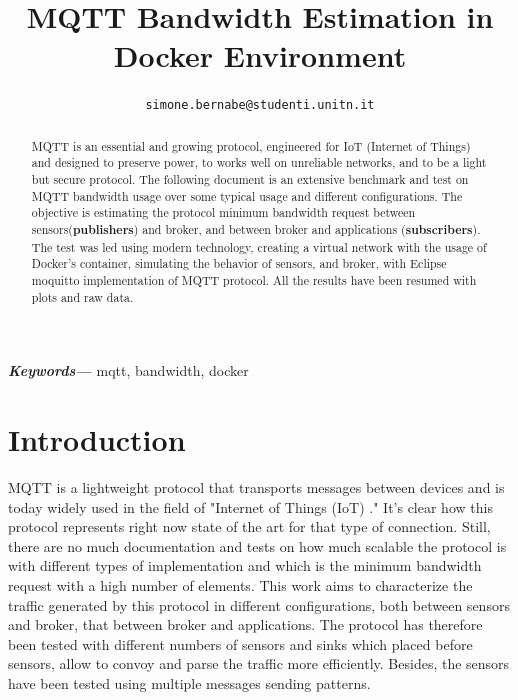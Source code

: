 \documentclass[journal]{IEEEtran}
\providecommand{\keywords}[1]
{
	\small	
	\textbf{\textit{Keywords---}} #1
}
\begin{document}
\title{MQTT Bandwidth Estimation in Docker Environment}

\author{
	\texttt{simone.bernabe@studenti.unitn.it}
}

\makeatletter
\def\endthebibliography{%
	\def\@noitemerr{\@latex@warning{Empty `thebibliography' environment}}%
	\endlist
}
\makeatother


\maketitle

\begin{abstract}
MQTT is an essential and growing protocol, engineered for IoT (Internet of Things) and designed to preserve power, to works well on unreliable networks, and to be a light but secure protocol. The following document is an extensive benchmark and test on MQTT bandwidth usage over some typical usage and different configurations. The objective is estimating the protocol minimum bandwidth request between sensors(\textbf{publishers}) and broker, and between broker and applications (\textbf{subscribers}). The test was led using modern technology, creating a virtual network with the usage of Docker's container, simulating the behavior of sensors, and broker, with Eclipse moquitto implementation of MQTT protocol. All the results have been resumed with plots and raw data.
\end{abstract}
\hspace{10pt}

\keywords{mqtt, bandwidth, docker}

\acresetall

\section{Introduction}
\label{sec:introduction}
MQTT is a lightweight protocol that transports messages between devices and is today widely used in the field of "Internet of Things (IoT) \cite{mqtt}." 
It's clear how this protocol represents right now state of the art for that type of connection. Still, there are no much documentation and tests on how much scalable the protocol is with different types of implementation and which is the minimum bandwidth request with a high number of elements. This work aims to characterize the traffic generated by this protocol in different configurations, both between sensors and broker, that between broker and applications. The protocol has therefore been tested with different numbers of sensors and sinks which placed before sensors, allow to convoy and parse the traffic more efficiently. Besides, the sensors have been tested using multiple messages sending patterns. 
\end{document}
